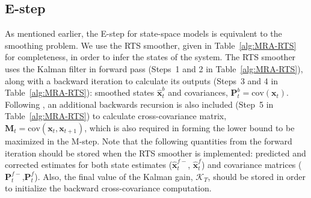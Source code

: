 \documentclass[review,authoryear,3p]{elsarticle}
\begin{document}
\subsection{E-step}
As mentioned earlier, the E-step for state-space models is equivalent to the smoothing problem. We use the RTS smoother, given in Table~\ref{alg:MRA-RTS} for completeness, in order to infer the states of the system. The RTS smoother uses the Kalman filter \citep{Kalman1960} in forward pass (Steps~1 and 2 in Table~\ref{alg:MRA-RTS}), along with a backward iteration to calculate its outputs (Steps~3 and 4 in Table~\ref{alg:MRA-RTS}): smoothed states $\hat{\mathbf x}^b_t$ and covariances, $\mathbf P^b_t=\mathrm{cov}(\mathbf{x}_t)$. Following \cite{Gibsona2005}, an additional backwards recursion is also included (Step~5 in Table~\ref{alg:MRA-RTS})	to calculate cross-covariance matrix, $\mathbf M_t=\mathrm{cov}(\mathbf{x}_{t},\mathbf{x}_{t+1})$, which is also required in forming the lower bound to be maximized in the M-step. Note that the following quantities from the forward iteration should be stored when the RTS smoother is implemented: predicted and corrected estimates for both state estimates ($\hat{\mathbf{x}}_t^{f-}$, $\hat{\mathbf{x}}_t^{f}$) and covariance matrices ($\mathbf P_t^{f-}$,$\mathbf P_t^f$). Also, the final value of the Kalman gain, $\mathcal K_T$, should be stored in order to initialize the backward cross-covariance computation. 
\renewcommand{\arraystretch}{1.7}
\end{document}
